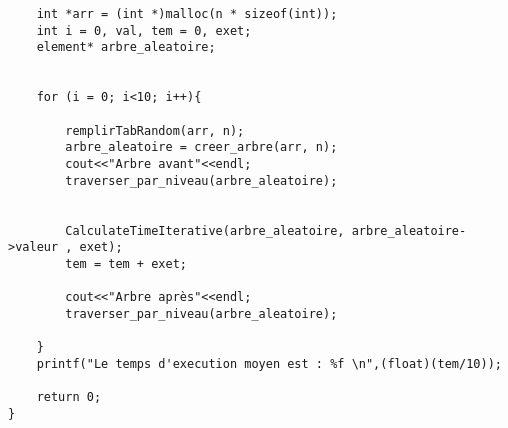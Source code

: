 \begin{verbatim}
	int *arr = (int *)malloc(n * sizeof(int));
	int i = 0, val, tem = 0, exet;
	element* arbre_aleatoire;
    
	
	for (i = 0; i<10; i++){
		
        remplirTabRandom(arr, n);
        arbre_aleatoire = creer_arbre(arr, n);
        cout<<"Arbre avant"<<endl;
        traverser_par_niveau(arbre_aleatoire);

    
        CalculateTimeIterative(arbre_aleatoire, arbre_aleatoire->valeur , exet);
		tem = tem + exet;

        cout<<"Arbre après"<<endl;
        traverser_par_niveau(arbre_aleatoire);

	}
    printf("Le temps d'execution moyen est : %f \n",(float)(tem/10));

	return 0;
}

\end{verbatim}

